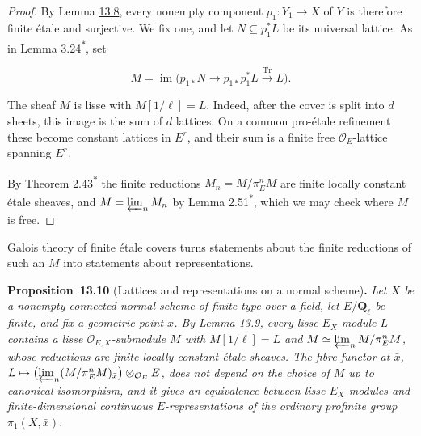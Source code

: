 \documentclass[11pt]{article}
\newenvironment{bpstatement}[2]{\par\addvspace{0.6\baselineskip}\noindent\textbf{#1}#2\textbf{.}\enspace\ignorespaces}
  {\par\addvspace{0.4\baselineskip}}
\newenvironment{bpstatementit}[2]{\begin{bpstatement}{#1}{#2}\itshape\ignorespaces}{\end{bpstatement}}
\newcommand{\bpout}[1]{#1\textsuperscript{\hyperlink{bp-outside}{\ensuremath{\ast}}}}
\begin{document}
\begin{proof}[{Proof}]
By Lemma \hyperref[bp28]{13.8}, every nonempty component \(p_1:Y_1\to X\) of \(Y\) is therefore finite étale and surjective. We fix one, and let \(N\subseteq p_1^*L\) be its universal lattice. As in Lemma \bpout{3.24}, set

\[
M=\operatorname{im}\bigl(
p_{1*}N\longrightarrow p_{1*}p_1^*L
\xrightarrow{\operatorname{Tr}}L\bigr).
\]

The sheaf \(M\) is lisse with \(M[1/\ell]=L\). Indeed, after the cover is split into \(d\) sheets, this image is the sum of \(d\) lattices. On a common pro-étale refinement these become constant lattices in \(E^r\), and their sum is a finite free \(\mathcal O_E\)-lattice spanning \(E^r\).

By Theorem \bpout{2.43} the finite reductions \(M_n=M/\pi_E^nM\) are finite locally constant étale sheaves, and \(M=\varprojlim_nM_n\) by Lemma \bpout{2.51}, which we may check where \(M\) is free.
\end{proof}

\label{bp33}%
Galois theory of finite étale covers turns statements about the finite reductions of such an \(M\) into statements about representations.

\label{bp34}%
\begin{bpstatementit}{Proposition~13.10}{ (Lattices and representations on a normal scheme)}
Let \(X\) be a nonempty connected normal scheme of finite type over a field, let \(E/\mathbf Q_\ell\) be finite, and fix a geometric point \(\bar x\). By Lemma \hyperref[bp31]{13.9}, every lisse \(E_X\)-module \(L\) contains a lisse \(\mathcal O_{E,X}\)-submodule \(M\) with \(M[1/\ell]=L\) and \(M\simeq\varprojlim_nM/\pi_E^nM\), whose reductions are finite locally constant étale sheaves. The fibre functor at \(\bar x\), \(L\mapsto\bigl(\varprojlim_n(M/\pi_E^nM)_{\bar x}\bigr)\otimes_{\mathcal O_E}E\), does not depend on the choice of \(M\) up to canonical isomorphism, and it gives an equivalence between lisse \(E_X\)-modules and finite-dimensional continuous \(E\)-representations of the ordinary profinite group \(\pi_1(X,\bar x)\).
\end{bpstatementit}
\end{document}

